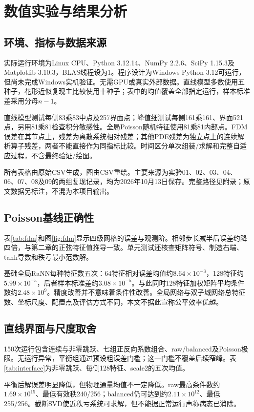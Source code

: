 \chapter{数值实验与结果分析}
\section{环境、指标与数据来源}
实际运行环境为Linux CPU、Python 3.12.14、NumPy 2.2.6、SciPy 1.15.3及Matplotlib 3.10.3，BLAS线程设为1。程序设计为Windows Python 3.12可运行，但尚未完成Windows实机验证。无需GPU或真实外部数据。直线模型多数使用五种子，花形近似复现主比较使用十种子；表中的均值覆盖全部指定运行，样本标准差采用分母$n-1$。

直线模型测试每侧83乘83中点及257界面点；峰值细测试每侧161乘161、界面521点，另用81乘81检查积分敏感性。全局Poisson随机特征使用81乘81内部点。FDM误差在其节点上，残差为离散系统相对残差；其他PDE残差为独立点上的连续解析算子残差，两者不能直接作为同指标比较。时间区分单次组装/求解和完整自适应过程，不含最终验证/绘图。

所有表格由原始CSV生成，图由CSV重绘。主要来源为实验01、02、03、04、06、07、08及09的两组复现记录，均为2026年10月13日保存。完整路径见附录；原文数据另标注，不混为本项目输出。

\section{Poisson基线正确性}
表\ref{tab:fdm}和图\ref{fig:fdm}显示四级网格的误差与观测阶。相邻步长减半后误差约降四倍，与第二章的正弦特征值推导一致。单元测试还核查矩阵符号、制造右端、tanh导数和秩亏最小范数解。
\begin{table}[htbp]\centering\caption{Poisson五点差分真实结果}\label{tab:fdm}\end{table}
基础全局RaNN每种特征数五次：64特征相对误差均值约$8.64\times10^{-3}$，128特征约$5.99\times10^{-5}$，后者样本标准差约$3.08\times10^{-5}$。与此同时128特征加权矩阵平均条件数约$2.48\times10^9$。精度改善并不意味着条件性改善。全局网络与双子域网络总特征数、坐标尺度、配置点及评估方式不同，本文不据此宣称公平效率优越。

\section{直线界面与尺度取舍}
150次运行包含连续与非零跳跃、七组正反向系数组合、raw/balanced及Poisson极限。无运行异常，平衡组通过预设粗误差门槛；这一门槛不覆盖后续窄峰。表\ref{tab:interface}为非零跳跃、每侧128特征、scale2的五次均值。
\begin{table}[htbp]\centering\caption{高对比度下解与物理通量的尺度取舍}\label{tab:interface}\end{table}
平衡后解误差明显降低，但物理通量均值不一定降低。raw最高条件数约$1.69\times10^{15}$、最低有效秩240/256；balanced仍可达到约$2.11\times10^{12}$、最低255/256。截断SVD使近秩亏系统可求解，但不能据正常运行声称病态已消除。


